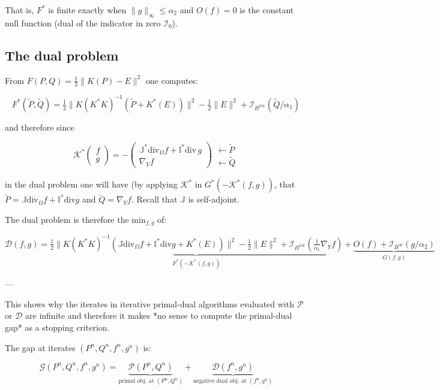 \documentclass{article}
\begin{document}
That is, $F^*$ is finite exactly when $\|g\|_\infty \leq \alpha_2$ and $O(f)=0$ is the constant null function (dual of the indicator in zero $\mathcal{I}_0$).

\subsection*{The dual problem}

From $ F(P,Q) = \tfrac{1}{2} \| K(P)-E \|^2 $ one computes:

$$ F^*(\tilde{P},\tilde{Q}) = \tfrac{1}{2}\| K(K^*K)^{-1}(\tilde{P}+K^*(E))\|^2-\tfrac{1}{2}\|E\|^2+\mathcal{I}_{B^{2\infty}}(\tilde{Q}/\alpha_1) $$

and therefore  since

$$\mathcal{K}^* \begin{pmatrix} f \\ g \end{pmatrix} = -\begin{pmatrix} \mathbb{J}^*\mathrm{div}_\Omega f + \mathbb{I}^*\mathrm{div}\, g \\ \nabla_Y f \end{pmatrix} \begin{matrix} \leftarrow \tilde{P} \\ \leftarrow \tilde{Q} \end{matrix}$$

in the dual problem one will have (by applying $\mathcal{K}^*$ in $G^*(-\mathcal{K}^*(f,g))$, that $\tilde{P}=\mathbb{J}\mathrm{div}_\Omega f + \mathbb{I}^*\mathrm{div} g$ and $\tilde{Q}=\nabla_Yf$. Recall that $\mathbb{J}$ is self-adjoint.

The dual problem is therefore the $\mathrm{min}_{f,g}$ of:

$$ \mathcal{D}(f,g) =
\underbrace{
\tfrac{1}{2}\| K(K^*K)^{-1}(\mathbb{J}\mathrm{div}_\Omega f + \mathbb{I}^*\mathrm{div} g+K^*(E))\|^2 - \tfrac{1}{2}\|E\|^2
+ \mathcal{I}_{B^{2\infty}}(\tfrac{1}{\alpha_1}\nabla_Y f)
}_{F^*(-\mathcal{K}^*(f,g))}
+
\underbrace{
O(f) + \mathcal{I}_{B^\infty}(g/\alpha_2)
}_{G(f,g)}
 $$

---

  This shows why the iterates in iterative primal-dual algorithms evaluated with $\mathcal{P}$ or $\mathcal{D}$ are infinite and therefore it makes *no sense to compute the primal-dual gap* as a stopping criterion.

The gap at iterates $(P^n, Q^n, f^n, g^n)$ is:

$$\mathcal{G}(P^n,Q^n,f^n,g^n) = \underbrace{\mathcal{P}(P^n,Q^n)}_{\text{primal obj. at }(P^n,Q^n)} + \underbrace{\mathcal{D}(f^n,g^n)}_{\text{negative dual obj. at }(f^n,g^n)}$$
\end{document}
